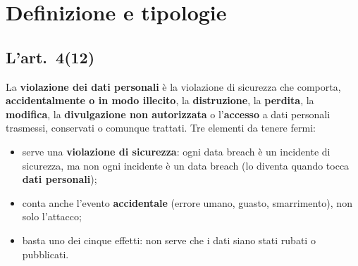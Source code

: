 \section{Definizione e tipologie}
\label{sec:breach-definizione}

\subsection{L'art.~4(12)}
La \textbf{violazione dei dati personali} è la violazione di sicurezza che comporta,
\textbf{accidentalmente o in modo illecito}, la \textbf{distruzione}, la \textbf{perdita}, la
\textbf{modifica}, la \textbf{divulgazione non autorizzata} o l'\textbf{accesso} a dati personali
trasmessi, conservati o comunque trattati. Tre elementi da tenere fermi:
\begin{itemize}
  \item serve una \textbf{violazione di sicurezza}: ogni data breach è un incidente di sicurezza, ma
    non ogni incidente è un data breach (lo diventa quando tocca \textbf{dati personali});
  \item conta anche l'evento \textbf{accidentale} (errore umano, guasto, smarrimento), non solo
    l'attacco;
  \item basta uno dei cinque effetti: non serve che i dati siano stati rubati o pubblicati.
\end{itemize}

